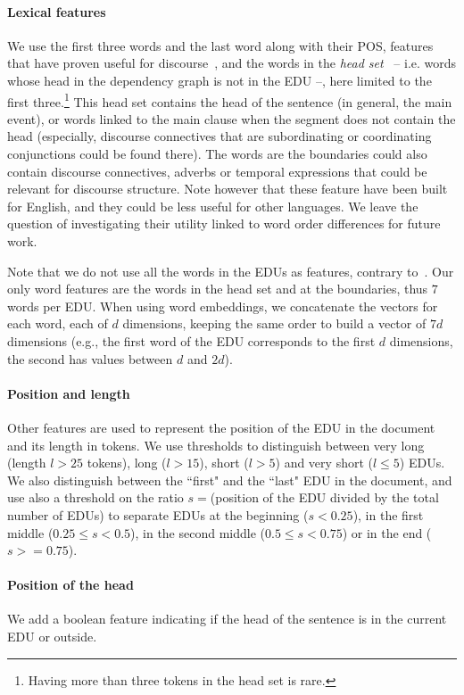 \documentclass[11pt]{article}
\begin{document}
\paragraph{Lexical features}
We use the first three words and the last word along with their POS, features that have proven useful for discourse~\cite{pitler:automati:2009}, and the words in the \emph{head set}~\cite{sagae:analysis:2009} -- i.e. words whose head in the dependency graph is not in the EDU --, here limited to the first three.\footnote{Having more than three tokens in the head set is rare.} 
This head set contains the head of the sentence (in general, the main event), or words linked to the main clause when the segment does not contain the head (especially, discourse connectives that are subordinating or coordinating conjunctions could be found there).
The words are the boundaries could also contain discourse connectives, adverbs or temporal expressions that could be relevant for discourse structure.
Note however that these feature have been built for English, and they could be less useful for other languages.
We leave the question of investigating their utility linked to word order differences for future work.

Note that we do not use all the words in the EDUs as features, contrary to~\cite{li:recursive:2014,ji:representation:2014}. 
Our only word features are the words in the head set and at the boundaries, thus $7$ words per EDU.
When using word embeddings, we concatenate the vectors for each word, each of $d$ dimensions, keeping the same order to build a vector of $7d$ dimensions (e.g., the first word of the EDU corresponds to the first $d$ dimensions, the second has values between $d$ and $2d$). 

\paragraph{Position and length}
Other features are used to represent the position of the EDU in the document and its length in tokens.
We use thresholds to distinguish between very long (length $l>25$ tokens), long ($l>15$), short ($l>5$) and very short ($l\leq5$) EDUs. 
We also distinguish between the ``first" and the ``last" EDU in the document, and use also a threshold on the ratio $s=$(position of the EDU divided by the total number of EDUs) to separate EDUs at the beginning ($s < 0.25$), in the first middle ($0.25 \leq s < 0.5$), in the second middle ($0.5 \leq s < 0.75$) or in the end ($s>=0.75$). 

\paragraph{Position of the head}
We add a boolean feature indicating if the head of the sentence is in the current EDU or outside.
\end{document}
